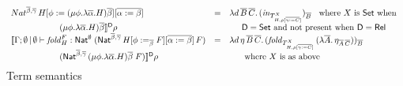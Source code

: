 \documentclass[runningheads]{llncs}
\newcommand{\set}{\mathsf{Set}}
\newcommand{\fold}{\mathit{fold}}
\begin{document}
\begin{figure*}
{\begin{minipage}[t]{0.5\textwidth}
\[\begin{array}{lll}
Nat^{\ol{\beta},\ol{\gamma}} \, H[\phi := (\mu \phi.\lambda {\overline
    \alpha}.H){\overline \beta}][\ol{\alpha := \beta}] & = &
\lambda d\,\ol{B}\,
\ol{C}.\,(\mathit{in}_{{T}^X_{H,\rho[\ol{\gamma :=
        C}]}})_{\ol{B}} \;\;\mbox{ where } X \mbox{ is } \set \mbox{ when } \\ 
\hspace*{0.79in}(\mu \phi.\lambda {\overline \alpha}.H){\overline
  \beta} \rrbracket^{\mathsf{D}} \rho & & \hspace*{0.2in}  
\mathsf{D} = \set \mbox{ and not present when }
\mathsf{D} = \rel\\  
\llbracket \Gamma;\emptyset \,|\, \emptyset \vdash
  \fold^F_H : \Nat^\emptyset\;(\Nat^{\ol{\beta}, \ol{\gamma}}\,H[\phi
    :=_{\ol{\beta}} F][\ol{\alpha := \beta}]\,F) & = &  
\lambda d\,\eta\,\ol{B}\,\ol{C}.\,
(\mathit{fold}_{T^X_{H,\rho[\ol{\gamma := C}]}} \, (\lambda
\ol{A}.\,\eta_{\ol{A}\,\ol{C}}))_{\ol{B}}\\ 
\hspace*{0.79in}(\Nat^{{\ol{\beta},\ol{\gamma}} }\,(\mu
  \phi.\lambda \overline \alpha.H)\overline \beta\;F)
\rrbracket^{\mathsf{D}} \rho & & \hspace*{0.2in} \mbox{ where } X \mbox{ is as above
}\vspace*{-0.1in} 
\end{array}\]
\caption{Term semantics}\label{fig:term-sem} 
\end{minipage}}\vspace*{-0.05in}
\end{figure*}
\end{document}
